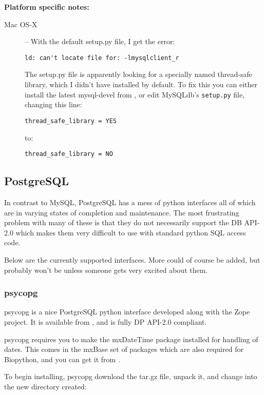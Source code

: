 \documentclass{article}
\begin{document}
\textbf{\large Platform specific notes:}
\begin{description}
  \item[Mac OS-X] -- With the default setup.py file, I get the error:

  \verb|ld: can't locate file for: -lmysqlclient_r|
  
  The setup.py file
  is apparently looking for a specially named thread-safe library, which
  I didn't have installed by default. To fix this you can either
  install the latest mysql-devel from
  , or edit MySQLdb's
  \verb|setup.py| file, changing this line:

  \verb|thread_safe_library = YES|

  to:

  \verb|thread_safe_library = NO|
  
\end{description}

\subsection{PostgreSQL}

In contrast to MySQL, PostgreSQL has a mess of python interfaces all of
which are in varying states of completion and maintenance. The most
frustrating problem with many of these is that they do not necessarily
support the DB API-2.0 which makes them very difficult to use with
standard python SQL access code.


Below are the currently supported interfaces. More could of course be
added, but probably won't be unless someone gets very excited about
them.

\subsubsection{psycopg} 

psycopg is a nice PostgreSQL python interface developed along with the
Zope project. It is available from 
, and is fully
DP API-2.0 compliant.


psycopg requires you to make the mxDateTime package installed for
handling of dates. This comes in the mxBase set of packages which are
also required for Biopython, and you can get it from
.


To begin installing, psycopg download the tar.gz file, unpack it, and
change into the new directory created:
\end{document}
